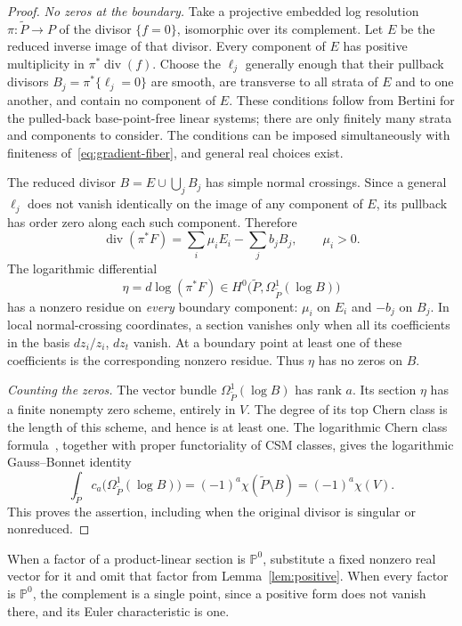\documentclass[11pt]{article}
\theoremstyle{remark}\newtheorem{remark}[theorem]{Remark}
\newcommand{\PP}{\mathbb P}
\begin{document}
\begin{proof}
\emph{No zeros at the boundary.}
Take a projective embedded log resolution $\pi:\widetilde P\to P$ of the divisor $\{f=0\}$, isomorphic over its complement. Let $E$ be the reduced inverse image of that divisor. Every component of $E$ has positive multiplicity in $\pi^*\operatorname{div}(f)$. Choose the $\ell_j$ generally enough that their pullback divisors $B_j=\pi^*\{\ell_j=0\}$ are smooth, are transverse to all strata of $E$ and to one another, and contain no component of $E$. These conditions follow from Bertini for the pulled-back base-point-free linear systems; there are only finitely many strata and components to consider. The conditions can be imposed simultaneously with finiteness of~\eqref{eq:gradient-fiber}, and general real choices exist.

The reduced divisor $B=E\cup\bigcup_jB_j$ has simple normal crossings. Since a general $\ell_j$ does not vanish identically on the image of any component of $E$, its pullback has order zero along each such component. Therefore
\[
 \operatorname{div}(\pi^*F)=\sum_i\mu_iE_i-\sum_jb_jB_j,
 \qquad \mu_i>0.
\]
The logarithmic differential
\[
 \eta=d\log(\pi^*F)\in H^0\bigl(\widetilde P,\Omega^1_{\widetilde P}(\log B)\bigr)
\]
has a nonzero residue on \emph{every} boundary component: $\mu_i$ on $E_i$ and $-b_j$ on $B_j$. In local normal-crossing coordinates, a section vanishes only when all its coefficients in the basis $dz_i/z_i$, $dz_t$ vanish. At a boundary point at least one of these coefficients is the corresponding nonzero residue. Thus $\eta$ has no zeros on $B$.

\emph{Counting the zeros.}
The vector bundle $\Omega^1_{\widetilde P}(\log B)$ has rank $a$. Its section $\eta$ has a finite nonempty zero scheme, entirely in $V$. The degree of its top Chern class is the length of this scheme, and hence is at least one. The logarithmic Chern class formula~\cite[(7.4)]{AH}, together with proper functoriality of CSM classes, gives the logarithmic Gauss--Bonnet identity
\[
 \int_{\widetilde P}c_a\bigl(\Omega^1_{\widetilde P}(\log B)\bigr)
   =(-1)^a\chi(\widetilde P\setminus B)
   =(-1)^a\chi(V).
\]
This proves the assertion, including when the original divisor is singular or nonreduced.
\end{proof}

When a factor of a product-linear section is $\PP^0$, substitute a fixed nonzero real vector for it and omit that factor from Lemma~\ref{lem:positive}. When every factor is $\PP^0$, the complement is a single point, since a positive form does not vanish there, and its Euler characteristic is one.
\end{document}
